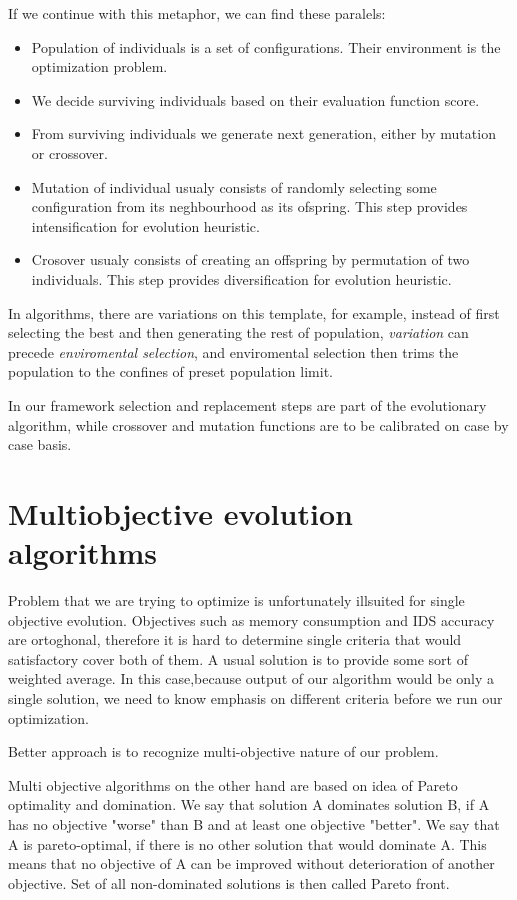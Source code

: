 \documentclass[12pt,oneside,draft]{fithesis2}
\begin{document}
If we continue with this metaphor, we can find these paralels:
\begin{itemize}
\item Population of individuals is a set of configurations. Their environment is the optimization problem.
\item We decide surviving individuals based on their evaluation function score.
\item From surviving individuals we generate next generation, either by mutation or crossover.
\item Mutation of individual usualy consists of randomly selecting some configuration from its neghbourhood as its ofspring. This step provides intensification for evolution heuristic.
\item Crosover usualy consists of creating an offspring by permutation of two individuals. This step provides diversification for evolution heuristic.
\end{itemize}

In algorithms, there are variations on this template, for example, instead of first selecting the best and then generating the rest of population, \emph{variation} can precede \emph{enviromental selection}, and enviromental selection then trims the population to the confines of preset population limit.

In our framework selection and replacement steps are part of the evolutionary algorithm, while crossover and mutation functions are to be calibrated on case by case basis.

\section{Multiobjective evolution algorithms}
Problem that we are trying to optimize is unfortunately illsuited for single objective evolution. Objectives such as memory consumption and IDS accuracy are ortoghonal, therefore it is hard to determine single criteria that would satisfactory cover both of them. A usual solution is to provide some sort of weighted average. In this case,because output of our algorithm would be only a single solution, we need to know emphasis on different criteria before we run our optimization. 

Better approach is to recognize multi-objective nature of our problem.

Multi objective algorithms on the other hand are based on idea of Pareto optimality and domination. We say that solution A dominates solution B, if A has no objective "worse" than B and at least one objective "better". We say that A is pareto-optimal, if there is no other solution that would dominate A. This means that no objective of A can be improved without deterioration of another objective. Set of all non-dominated solutions is then called Pareto front. 
\end{document}
